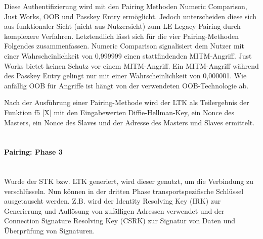 Diese Authentifizierung wird mit den Pairing Methoden Numeric Comparison, Just Works, OOB und Passkey Entry ermöglicht. Jedoch unterscheiden diese sich aus funktionaler Sicht (nicht aus Nutzersicht) zum LE Legacy Pairing durch komplexere Verfahren. Letztendlich lässt sich für die vier Pairing-Methoden Folgendes zusammenfassen. Numeric Comparison signalisiert dem Nutzer mit einer Wahrscheinlichkeit von 0,999999 einen stattfindenden MITM-Angriff. 
Just Works bietet keinen Schutz vor einem MITM-Angriff. 
Ein MITM-Angriff während des Passkey Entry gelingt nur mit einer Wahrscheinlichkeit von 0,000001. 
Wie anfällig OOB für Angriffe ist hängt von der verwendeten OOB-Technologie ab.

Nach der Ausführung einer Pairing-Methode wird der LTK als Teilergebnis der Funktion f5 [X] 
mit den Eingabewerten Diffie-Hellman-Key, ein Nonce des Masters, ein Nonce des Slaves und der Adresse des Masters und Slaves ermittelt.\\\\

\paragraph{Pairing: Phase 3} \mbox{} \vspace{0.2cm} \\

Wurde der STK bzw. LTK generiert, wird dieser genutzt, um die Verbindung zu verschlüsseln. Nun können in der dritten Phase transportspezifische Schlüssel ausgetauscht werden. Z.B. wird der Identity Resolving Key (IRK) zur Generierung und Auflösung von zufälligen Adressen verwendet und der Connection Signature Resolving Key (CSRK) zur Signatur von Daten und Überprüfung von Signaturen.



